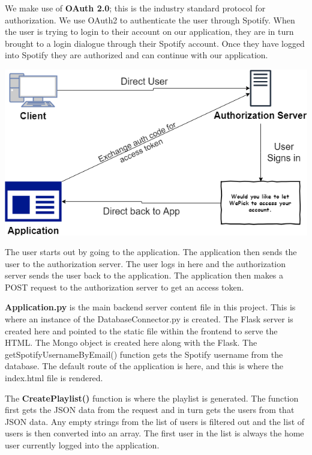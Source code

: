 We make use of \textbf{OAuth 2.0}; this is the industry standard protocol for authorization. We use OAuth2 to authenticate the user through Spotify. When the user is trying to login to their account on our application, they are in turn brought to a login dialogue through their Spotify account. Once they have logged into Spotify they are authorized and can continue with our application.\newline

\begin{center}    
	\includegraphics{img/auth.png}
\end{center}
The user starts out by going to the application. The application then sends the user to the authorization server. The user logs in here and the authorization server sends the user back to the application. The application then makes a POST request to the authorization server to get an access token.\newline

\textbf{Application.py} is the main backend server content file in this project. This is where an instance of the DatabaseConnector.py is created. The Flask server is created here and pointed to the static file within the frontend to serve the HTML. The Mongo object is created here along with the Flask. The getSpotifyUsernameByEmail() function gets the Spotify username from the database. The default route of the application is here, and this is where the index.html file is rendered.\newline

The \textbf{CreatePlaylist()} function is where the playlist is generated. The function first gets the JSON data from the request and in turn gets the users from that JSON data. Any empty strings from the list of users is filtered out and the list of users is then converted into an array. The first user in the list is always the home user currently logged into the application.\newline

